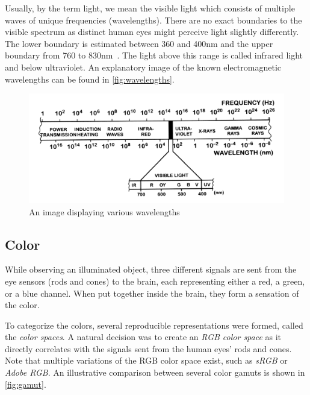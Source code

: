 Usually, by the term light, we mean the visible light which consists of multiple waves of unique frequencies (wavelengths). There are no exact boundaries to the visible spectrum as distinct human eyes might perceive light slightly differently. The lower boundary is estimated between 360 and 400nm and the upper boundary from 760 to 830nm~\cite{sliney2016light}. The light above this range is called infrared light and below ultraviolet. An explanatory image of the known electromagnetic wavelengths can be found in \autoref{fig:wavelengths}.

\begin{figure}[h]
	\centering
	\includegraphics[width=0.8\linewidth]{img/wavelengths.png}
	\caption{An image displaying various wavelengths~\cite{colorScienceSlides}}
	\label{fig:wavelengths}
\end{figure}

\subsection{Color}

While observing an illuminated object, three different signals are sent from the eye sensors (rods and cones) to the brain, each representing either a red, a green, or a blue channel. When put together inside the brain, they form a sensation of the color. 

To categorize the colors, several reproducible representations were formed, called the \emph{color spaces}. A natural decision was to create an \emph{RGB color space} as it directly correlates with the signals sent from the human eyes' rods and cones. Note that multiple variations of the RGB color space exist, such as \emph{sRGB} or \emph{Adobe RGB}. An illustrative comparison between several color gamuts is shown in \autoref{fig:gamut}.

